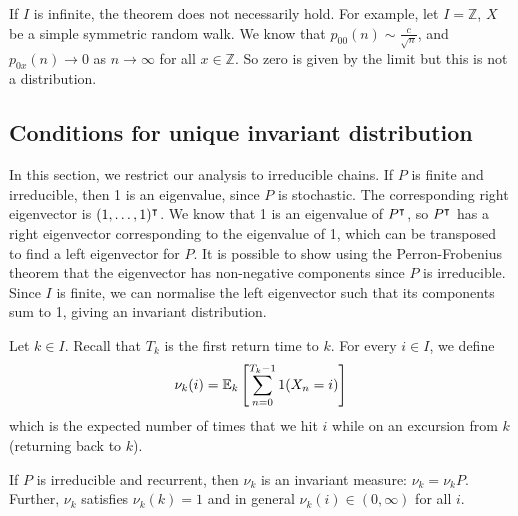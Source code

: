 \begin{remark}
	If \( I \) is infinite, the theorem does not necessarily hold.
	For example, let \( I = \mathbb Z \), \( X \) be a simple symmetric random walk.
	We know that \( p_{00}(n) \sim \frac{c}{\sqrt{n}} \), and \( p_{0x}(n) \to 0 \) as \( n \to \infty \) for all \( x \in \mathbb Z \).
	So zero is given by the limit but this is not a distribution.
\end{remark}

\subsection{Conditions for unique invariant distribution}
In this section, we restrict our analysis to irreducible chains.
If \( P \) is finite and irreducible, then 1 is an eigenvalue, since \( P \) is stochastic.
The corresponding right eigenvector is \( (1, \dots, 1)^\intercal \).
We know that 1 is an eigenvalue of \( P^\intercal \), so \( P^\intercal \) has a right eigenvector corresponding to the eigenvalue of 1, which can be transposed to find a left eigenvector for \( P \).
It is possible to show using the Perron-Frobenius theorem that the eigenvector has non-negative components since \( P \) is irreducible.
Since \( I \) is finite, we can normalise the left eigenvector such that its components sum to 1, giving an invariant distribution.
\begin{definition}
	Let \( k \in I \).
	Recall that \( T_k \) is the first return time to \( k \).
	For every \( i \in I \), we define
	\[
		\nu_k(i) = \mathbb{E}_{k}\left[{\sum_{n=0}^{T_k - 1} 1(X_n = i)}\right]
	\]
	which is the expected number of times that we hit \( i \) while on an excursion from \( k \) (returning back to \( k \)).
\end{definition}
\begin{theorem}
	If \( P \) is irreducible and recurrent, then \( \nu_k \) is an invariant measure: \( \nu_k = \nu_k P \).
	Further, \( \nu_k \) satisfies \( \nu_k(k) = 1 \) and in general \( \nu_k(i) \in (0, \infty) \) for all \( i \).
\end{theorem}
